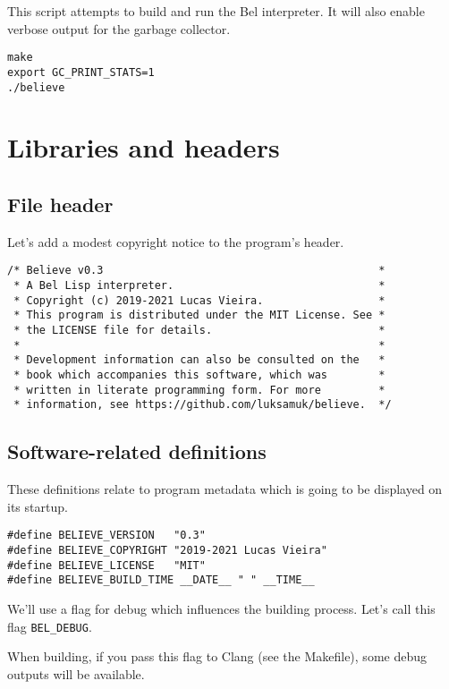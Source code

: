 \documentclass[openright,a4paper,twoside,12pt]{memoir}
\begin{document}
This script attempts to build and run the Bel interpreter. It will
also enable verbose output for the garbage collector.

\begin{verbatim}
make
export GC_PRINT_STATS=1
./believe
\end{verbatim}

\chapter{Libraries and headers}
\label{sec:org8c4b439}

\section{File header}
\label{sec:org0150293}

Let's add a modest copyright notice to the program's header.

\begin{verbatim}
/* Believe v0.3                                           *
 * A Bel Lisp interpreter.                                *
 * Copyright (c) 2019-2021 Lucas Vieira.                  *
 * This program is distributed under the MIT License. See *
 * the LICENSE file for details.                          *
 *                                                        *
 * Development information can also be consulted on the   *
 * book which accompanies this software, which was        * 
 * written in literate programming form. For more         *
 * information, see https://github.com/luksamuk/believe.  */
\end{verbatim}

\section{Software-related definitions}
\label{sec:org7bcf4cc}

These definitions relate to program metadata which is going to be
displayed on its startup.

\begin{verbatim}
#define BELIEVE_VERSION   "0.3"
#define BELIEVE_COPYRIGHT "2019-2021 Lucas Vieira"
#define BELIEVE_LICENSE   "MIT"
#define BELIEVE_BUILD_TIME __DATE__ " " __TIME__
\end{verbatim}

We'll use a flag for debug which influences the building
process. Let's call this flag \texttt{BEL\_DEBUG}.

When building, if you pass this flag to Clang (see the Makefile), some
debug outputs will be available.
\end{document}
